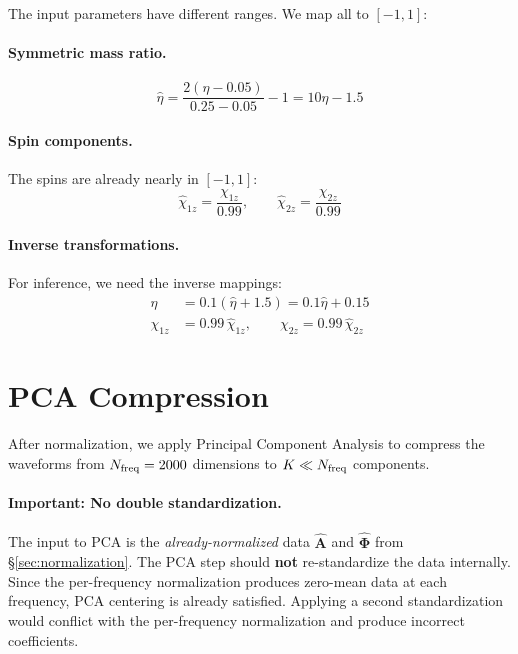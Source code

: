 \documentclass[11pt,a4paper]{article}
\begin{document}
The input parameters have different ranges. We map all to $[-1, 1]$:

\paragraph{Symmetric mass ratio.}
\begin{equation}
    \hat{\eta} = \frac{2(\eta - 0.05)}{0.25 - 0.05} - 1 = 10\eta - 1.5
    \label{eq:eta_norm}
\end{equation}

\paragraph{Spin components.}
The spins are already nearly in $[-1, 1]$:
\begin{equation}
    \hat{\chi}_{1z} = \frac{\chi_{1z}}{0.99}, \qquad \hat{\chi}_{2z} = \frac{\chi_{2z}}{0.99}
    \label{eq:chi_norm}
\end{equation}

\paragraph{Inverse transformations.}
For inference, we need the inverse mappings:
\begin{align}
    \eta &= 0.1(\hat{\eta} + 1.5) = 0.1\hat{\eta} + 0.15 \\
    \chi_{1z} &= 0.99 \, \hat{\chi}_{1z}, \qquad \chi_{2z} = 0.99 \, \hat{\chi}_{2z}
\end{align}

\section{PCA Compression}
\label{sec:pca}

After normalization, we apply Principal Component Analysis to compress the waveforms from $N_{\rm freq} = 2000$ dimensions to $K \ll N_{\rm freq}$ components.

\paragraph{Important: No double standardization.}
The input to PCA is the \emph{already-normalized} data $\hat{\mathbf{A}}$ and $\hat{\mathbf{\Phi}}$ from \S\ref{sec:normalization}. The PCA step should \textbf{not} re-standardize the data internally. Since the per-frequency normalization produces zero-mean data at each frequency, PCA centering is already satisfied. Applying a second standardization would conflict with the per-frequency normalization and produce incorrect coefficients.
\end{document}

